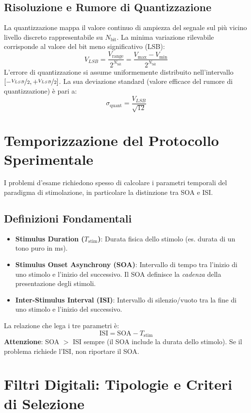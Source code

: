 \documentclass[10pt, letterpaper]{report}
\begin{document}
\subsection{Risoluzione e Rumore di Quantizzazione}
La quantizzazione mappa il valore continuo di ampiezza del segnale sul più vicino livello discreto rappresentabile su $N_{\text{bit}}$.
La minima variazione rilevabile corrisponde al valore del bit meno significativo (LSB):
\[
V_{LSB} = \frac{V_{\text{range}}}{2^{N_{\text{bit}}}} = \frac{V_{\max} - V_{\min}}{2^{N_{\text{bit}}}}
\]
L'errore di quantizzazione si assume uniformemente distribuito nell'intervallo $[-\nicefrac{V_{LSB}}{2}, +\nicefrac{V_{LSB}}{2}]$.
La sua deviazione standard (valore efficace del rumore di quantizzazione) è pari a:
\[
\sigma_{\text{quant}} = \frac{V_{LSB}}{\sqrt{12}}
\]

\section{Temporizzazione del Protocollo Sperimentale}
I problemi d'esame richiedono spesso di calcolare i parametri temporali del paradigma di stimolazione, in particolare la distinzione tra SOA e ISI.

\subsection{Definizioni Fondamentali}
\begin{itemize}
    \item \textbf{Stimulus Duration ($T_{\text{stim}}$)}: Durata fisica dello stimolo (es. durata di un tono puro in ms).
    \item \textbf{Stimulus Onset Asynchrony (SOA)}: Intervallo di tempo tra l'inizio di uno stimolo e l'inizio del successivo.
    Il SOA definisce la \emph{cadenza} della presentazione degli stimoli.
    \item \textbf{Inter-Stimulus Interval (ISI)}: Intervallo di silenzio/vuoto tra la fine di uno stimolo e l'inizio del successivo.
\end{itemize}
La relazione che lega i tre parametri è:
\[
\text{ISI} = \text{SOA} - T_{\text{stim}}
\]
\textbf{Attenzione}: SOA $>$ ISI sempre (il SOA include la durata dello stimolo). Se il problema richiede l'ISI, non riportare il SOA.

\section{Filtri Digitali: Tipologie e Criteri di Selezione}
\end{document}
